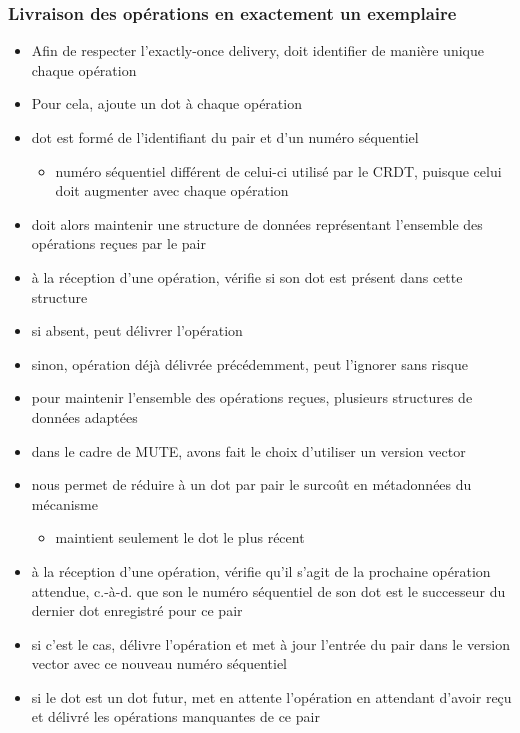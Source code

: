 \documentclass[12pt]{thesul}
\newcommand{\ie}{c.-à-d. }
\begin{document}
\subsubsection{Livraison des opérations en exactement un exemplaire}

\begin{itemize}
  \item Afin de respecter l'exactly-once delivery, doit identifier de manière unique chaque opération
  \item Pour cela, ajoute un dot à chaque opération
  \item dot est formé de l'identifiant du pair et d'un numéro séquentiel
  \begin{itemize}
    \item numéro séquentiel différent de celui-ci utilisé par le CRDT, puisque celui doit augmenter avec chaque opération
  \end{itemize}
  \item doit alors maintenir une structure de données représentant l'ensemble des opérations reçues par le pair
  \item à la réception d'une opération, vérifie si son dot est présent dans cette structure
  \item si absent, peut délivrer l'opération
  \item sinon, opération déjà délivrée précédemment, peut l'ignorer sans risque
  \item pour maintenir l'ensemble des opérations reçues, plusieurs structures de données adaptées
  \item dans le cadre de MUTE, avons fait le choix d'utiliser un version vector
  \item nous permet de réduire à un dot par pair le surcoût en métadonnées du mécanisme
  \begin{itemize}
    \item maintient seulement le dot le plus récent
  \end{itemize}
  \item à la réception d'une opération, vérifie qu'il s'agit de la prochaine opération attendue, \ie que son le numéro séquentiel de son dot est le successeur du dernier dot enregistré pour ce pair
  \item si c'est le cas, délivre l'opération et met à jour l'entrée du pair dans le version vector avec ce nouveau numéro séquentiel
  \item si le dot est un dot futur, met en attente l'opération en attendant d'avoir reçu et délivré les opérations manquantes de ce pair

\end{itemize}
\end{document}
